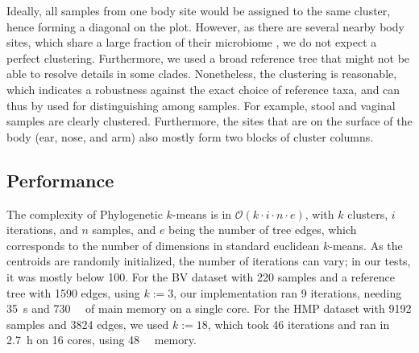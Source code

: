 Ideally, all samples from one body site would be assigned to the same cluster,
hence forming a diagonal on the plot.
However, as there are several nearby body sites, which share a large fraction of their microbiome \cite{Huttenhower2012},
we do not expect a perfect clustering.
Furthermore, we used a broad reference tree that might not be able to resolve details in some clades.
Nonetheless, the clustering is reasonable, which indicates a robustness against the exact choice of reference taxa,
and can thus by used for distinguishing among samples.
For example, stool and vaginal samples are clearly clustered.
Furthermore, the sites that are on the surface of the body (ear, nose, and arm)
also mostly form two blocks of cluster columns.


\subsection{Performance}
\label{ch:Clustering:sec:Results:sub:Performance}

The complexity of Phylogenetic $k$-means is in $\mathcal{O}(k \cdot i \cdot n \cdot e)$,
with $k$ clusters, $i$ iterations, and $n$ samples, and $e$ being the number of tree edges,
which corresponds to the number of dimensions in standard euclidean $k$-means.
As the centroids are randomly initialized, the number of iterations can vary;
in our tests, it was mostly below \num{100}.
For the \ac{BV} dataset with \num{220} samples and a reference tree with \num{1 590} edges, using $k:=3$,
our implementation ran \num{9} iterations, needing \SI{35}{\second} and \SI{730}{\mega\byte} of main memory on a single core.
For the \ac{HMP} dataset with \num{9 192} samples and \num{3 824} edges, we used $k:=18$,
which took \num{46} iterations and ran in \SI{2.7}{\hour} on \num{16} cores, using \SI{48}{\giga\byte} memory.

